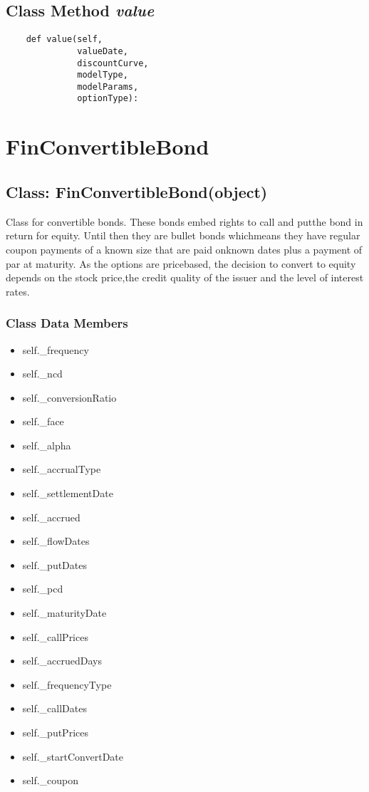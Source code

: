 \documentclass[twoside,11pt]{book}
\begin{document}
\subsection{Class Method {\it value}}


\begin{lstlisting}
    def value(self,
              valueDate,
              discountCurve,
              modelType,
              modelParams,
              optionType):
\end{lstlisting}

\newpage
\section{FinConvertibleBond}

\subsection{Class: FinConvertibleBond(object)}
Class for convertible bonds. These bonds embed rights to call and putthe bond in return for equity. Until then they are bullet bonds whichmeans they have regular coupon payments of a known size that are paid onknown dates plus a payment of par at maturity. As the options are pricebased, the decision to convert to equity depends on the stock price,the credit quality of the issuer and the level of interest rates.

\subsubsection{Class Data Members}
\begin{itemize}
\item{self.\_frequency}
\item{self.\_ncd}
\item{self.\_conversionRatio}
\item{self.\_face}
\item{self.\_alpha}
\item{self.\_accrualType}
\item{self.\_settlementDate}
\item{self.\_accrued}
\item{self.\_flowDates}
\item{self.\_putDates}
\item{self.\_pcd}
\item{self.\_maturityDate}
\item{self.\_callPrices}
\item{self.\_accruedDays}
\item{self.\_frequencyType}
\item{self.\_callDates}
\item{self.\_putPrices}
\item{self.\_startConvertDate}
\item{self.\_coupon}
\end{itemize}
\end{document}
